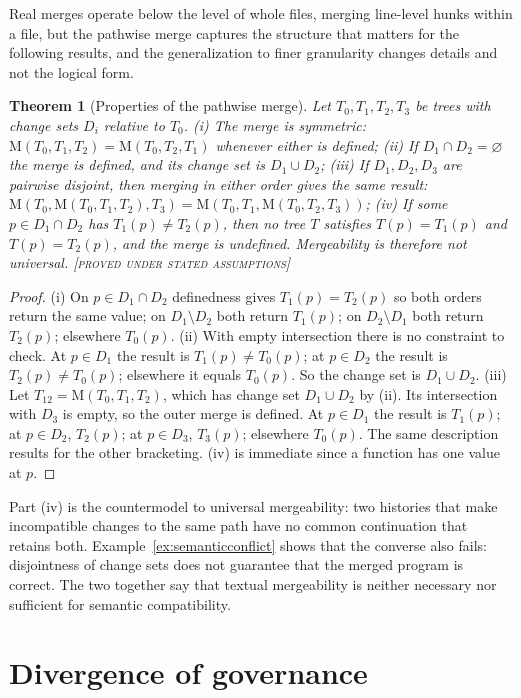 \documentclass[11pt,twoside,openright]{book}
\theoremstyle{plain}
\newtheorem{theorem}{Theorem}[chapter]
\theoremstyle{definition}
\theoremstyle{remark}
\newcommand{\Proved}{\textup{\textsc{[proved under stated assumptions]}}}
\begin{document}
Real merges operate below the level of whole files, merging line-level hunks within a file, but the pathwise merge captures the structure that matters for the following results, and the generalization to finer granularity changes details and not the logical form.

\begin{theorem}[Properties of the pathwise merge]\label{thm:pathmerge}
Let $T_0,T_1,T_2,T_3$ be trees with change sets $D_i$ relative to $T_0$.
(i) The merge is symmetric: $\mathrm{M}(T_0,T_1,T_2)=\mathrm{M}(T_0,T_2,T_1)$ whenever either is defined; (ii) If $D_1\cap D_2=\varnothing$ the merge is defined, and its change set is $D_1\cup D_2$; (iii) If $D_1,D_2,D_3$ are pairwise disjoint, then merging in either order gives the same result: $\mathrm{M}(T_0,\mathrm{M}(T_0,T_1,T_2),T_3)=\mathrm{M}(T_0,T_1,\mathrm{M}(T_0,T_2,T_3))$; (iv) If some $p\in D_1\cap D_2$ has $T_1(p)\ne T_2(p)$, then no tree $T$ satisfies $T(p)=T_1(p)$ and $T(p)=T_2(p)$, and the merge is undefined. Mergeability is therefore not universal.
\Proved{}
\end{theorem}

\begin{proof}
(i) On $p\in D_1\cap D_2$ definedness gives $T_1(p)=T_2(p)$ so both orders return the same value; on $D_1\setminus D_2$ both return $T_1(p)$; on $D_2\setminus D_1$ both return $T_2(p)$; elsewhere $T_0(p)$.
(ii) With empty intersection there is no constraint to check. At $p\in D_1$ the result is $T_1(p)\neq T_0(p)$; at $p\in D_2$ the result is $T_2(p)\ne T_0(p)$; elsewhere it equals $T_0(p)$. So the change set is $D_1\cup D_2$.
(iii) Let $T_{12}=\mathrm{M}(T_0,T_1,T_2)$, which has change set $D_1\cup D_2$ by (ii). Its intersection with $D_3$ is empty, so the outer merge is defined. At $p\in D_1$ the result is $T_1(p)$; at $p\in D_2$, $T_2(p)$; at $p\in D_3$, $T_3(p)$; elsewhere $T_0(p)$. The same description results for the other bracketing.
(iv) is immediate since a function has one value at $p$.
\end{proof}

Part (iv) is the countermodel to universal mergeability: two histories that make incompatible changes to the same path have no common continuation that retains both. Example~\ref{ex:semanticconflict} shows that the converse also fails: disjointness of change sets does not guarantee that the merged program is correct. The two together say that textual mergeability is neither necessary nor sufficient for semantic compatibility.

\section{Divergence of governance}
\end{document}
